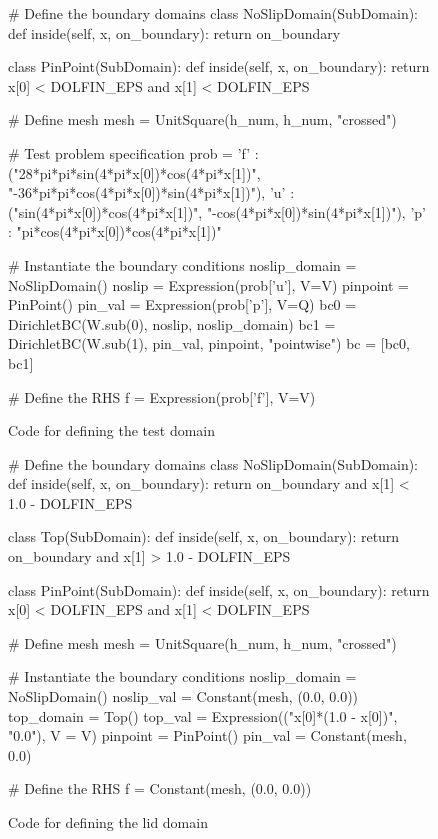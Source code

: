 \begin{figure}
\small
\begin{python}
# Define the boundary domains
class NoSlipDomain(SubDomain):
    def inside(self, x, on_boundary):
        return on_boundary

class PinPoint(SubDomain):
    def inside(self, x, on_boundary):
        return x[0] < DOLFIN_EPS and x[1] < DOLFIN_EPS

# Define mesh
mesh = UnitSquare(h_num, h_num, "crossed")

# Test problem specification
prob = {'f' : ("28*pi*pi*sin(4*pi*x[0])*cos(4*pi*x[1])",
                       "-36*pi*pi*cos(4*pi*x[0])*sin(4*pi*x[1])"),
            'u' : ("sin(4*pi*x[0])*cos(4*pi*x[1])",
                   "-cos(4*pi*x[0])*sin(4*pi*x[1])"),
            'p' : "pi*cos(4*pi*x[0])*cos(4*pi*x[1])"
    }

# Instantiate the boundary conditions
noslip_domain = NoSlipDomain()
noslip = Expression(prob['u'], V=V)
pinpoint = PinPoint()
pin_val = Expression(prob['p'], V=Q)
bc0 = DirichletBC(W.sub(0), noslip, noslip_domain)
bc1 = DirichletBC(W.sub(1), pin_val, pinpoint, "pointwise")
bc = [bc0, bc1]

# Define the RHS
f = Expression(prob['f'], V=V)

\end{python}
\label{terrel:code:domain:test}
\caption{Code for defining the test domain}
\end{figure}

\begin{figure}
\small
\begin{python}
# Define the boundary domains
class NoSlipDomain(SubDomain):
    def inside(self, x, on_boundary):
        return on_boundary and x[1] < 1.0 - DOLFIN_EPS

class Top(SubDomain):
    def inside(self, x, on_boundary):
        return on_boundary and x[1] > 1.0 - DOLFIN_EPS

class PinPoint(SubDomain):
    def inside(self, x, on_boundary):
        return x[0] < DOLFIN_EPS and x[1] < DOLFIN_EPS

# Define mesh
mesh = UnitSquare(h_num, h_num, "crossed")

# Instantiate the boundary conditions
noslip_domain = NoSlipDomain()
noslip_val = Constant(mesh, (0.0, 0.0))
top_domain = Top()
top_val = Expression(("x[0]*(1.0 - x[0])", "0.0"), V = V)
pinpoint = PinPoint()
pin_val = Constant(mesh, 0.0)

# Define the RHS
f = Constant(mesh, (0.0, 0.0))
\end{python}
\label{terrel:code:domain:lid}
\caption{Code for defining the lid domain}
\end{figure}


